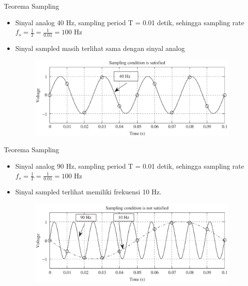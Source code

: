 \documentclass[pdflatex,compress,mathserif]{beamer}
\begin{document}
\begin{frame}{Teorema Sampling}
    \begin{itemize}
        \item Sinyal analog 40 Hz, sampling period T = 0.01 detik, sehingga sampling rate $f_s = \frac{1}{T} = \frac{1}{0.01} = 100$ Hz
        \item Sinyal sampled masih terlihat sama dengan sinyal analog
        \begin{figure}
            \includegraphics[width=\linewidth]{./img/img04.png}
        \end{figure}
    \end{itemize}
\end{frame}

\begin{frame}{Teorema Sampling}
    \begin{itemize}
        \item Sinyal analog 90 Hz, sampling period T = 0.01 detik, sehingga sampling rate $f_s = \frac{1}{T} = \frac{1}{0.01} = 100$ Hz
        \item Sinyal sampled terlihat memiliki frekuensi 10 Hz.
        \begin{figure}
            \includegraphics[width=\linewidth]{./img/img05.png}
        \end{figure}
    \end{itemize}
\end{frame}
\end{document}
